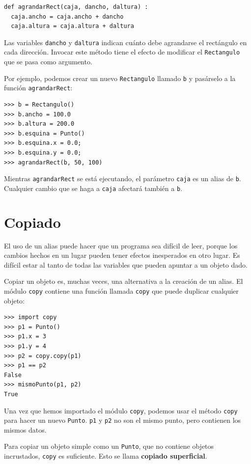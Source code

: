  
\begin{lstlisting}
def agrandarRect(caja, dancho, daltura) :
  caja.ancho = caja.ancho + dancho
  caja.altura = caja.altura + daltura
\end{lstlisting}
Las variables \texttt{dancho} y \texttt{daltura} indican cuánto debe
agrandarse el rectángulo en cada dirección. Invocar este método tiene
el efecto de modificar el \texttt{Rectangulo} que se pasa como argumento.

Por ejemplo, podemos crear un nuevo \texttt{Rectangulo} llamado \texttt{b}
y pasárselo a la función \texttt{agrandarRect}:
\begin{lstlisting}
>>> b = Rectangulo()
>>> b.ancho = 100.0
>>> b.altura = 200.0
>>> b.esquina = Punto()
>>> b.esquina.x = 0.0;
>>> b.esquina.y = 0.0;
>>> agrandarRect(b, 50, 100)
\end{lstlisting}
Mientras \texttt{agrandarRect} se está ejecutando, el parámetro \texttt{caja}
es un alias de \texttt{b}. Cualquier cambio que se haga a \texttt{caja}
afectará también a \texttt{b}.

\section{Copiado}

   

El uso de un alias puede hacer que un programa sea difícil de leer,
porque los cambios hechos en un lugar pueden tener efectos inesperados
en otro lugar. Es difícil estar al tanto de todas las variables que
pueden apuntar a un objeto dado.

Copiar un objeto es, muchas veces, una alternativa a la creación de
un alias. El módulo \texttt{copy} contiene una función llamada \texttt{copy}
que puede duplicar cualquier objeto:
\begin{lstlisting}
>>> import copy
>>> p1 = Punto()
>>> p1.x = 3
>>> p1.y = 4
>>> p2 = copy.copy(p1)
>>> p1 == p2
False
>>> mismoPunto(p1, p2)
True
\end{lstlisting}
Una vez que hemos importado el módulo \texttt{copy}, podemos usar
el método \texttt{copy} para hacer un nuevo \texttt{Punto}. \texttt{p1}
y \texttt{p2} no son el mismo punto, pero contienen los mismos datos.

Para copiar un objeto simple como un \texttt{Punto}, que no contiene
objetos incrustados, \texttt{copy} es suficiente. Esto se llama \textbf{copiado
superficial}.

